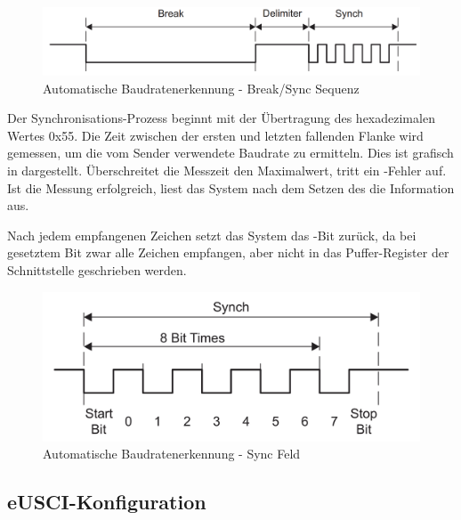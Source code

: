 \begin{figure}[h!]
	\centering
	\includegraphics[width=1.0\textwidth]{../Bilder/auto_baud.png}
	\caption{Automatische Baudratenerkennung - Break/Sync Sequenz\\}
	\label{fig:auto_baud}
\end{figure}

\newpage
Der Synchronisations-Prozess beginnt mit der \"Ubertragung des hexadezimalen Wertes 0x55. Die Zeit zwischen der ersten und letzten fallenden Flanke wird gemessen, um die vom Sender verwendete Baudrate zu ermitteln. Dies ist grafisch in  dargestellt. \"Uberschreitet die Messzeit den Maximalwert, tritt ein -Fehler auf. Ist die Messung erfolgreich, liest das System nach dem Setzen des  die Information aus. 

Nach jedem empfangenen Zeichen setzt das System das -Bit zur\"uck, da bei gesetztem Bit zwar alle Zeichen empfangen, aber nicht in das Puffer-Register der Schnittstelle geschrieben werden. 

\begin{figure}[h!]
	\centering
	\includegraphics[width=1.0\textwidth]{../Bilder/sync_field.png}
	\caption{Automatische Baudratenerkennung - Sync Feld\\}
	\label{fig:sync_field}
\end{figure}

\newpage
\subsection{eUSCI-Konfiguration}
\label{sec:eUSCI_Konfiguration}

